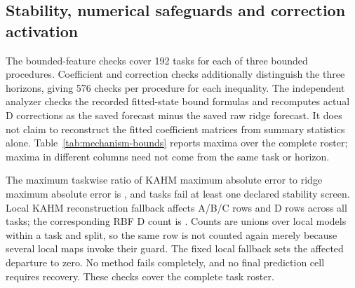 \subsection{Stability, numerical safeguards and correction activation}

The bounded-feature checks cover 192 tasks for each of three bounded
procedures. Coefficient and correction checks additionally distinguish the
three horizons, giving 576 checks per procedure for each inequality. The
independent analyzer checks the recorded fitted-state bound formulas and
recomputes actual D corrections as the saved forecast minus the saved raw
ridge forecast. It does not claim to reconstruct the fitted coefficient
matrices from summary statistics alone. Table~\ref{tab:mechanism-bounds}
reports maxima over the complete roster; maxima in different columns need
not come from the same task or horizon.

\begin{table}[!htbp]
\centering\small
\setlength{\tabcolsep}{5pt}
\caption{Observed ratios to the deterministic bounded-feature and
ridge-readout limits. Feature ratios concern the common block for the
common procedure and the respective departure block for the two appended
procedures; the readout bound uses the complete concatenated feature radius.
A zero correction with a zero bound contributes ratio zero. ``Violations''
sums failed feature, coefficient and correction checks at the fixed numerical
tolerances. These are implementation checks, not confidence intervals for
forecast risk.}
\label{tab:mechanism-bounds}

\end{table}

The maximum taskwise ratio of KAHM maximum absolute error to ridge maximum
absolute error is \RMMaxErrorRatio{}, and \RMStabilityFailures{} tasks fail
at least one declared stability screen. Local KAHM reconstruction fallback
affects \RMKFallbackABC{} A/B/C rows and \RMKFallbackD{} D rows across all
tasks; the corresponding RBF D count is \RMRFallbackD{}. Counts are unions
over local models within a task and split, so the same row is not counted
again merely because several local maps invoke their guard. The fixed local
fallback sets the affected departure to zero. No method fails completely, and no final prediction cell requires
recovery. These checks cover the complete task roster.

\begin{table}[!htbp]
\centering\small
\setlength{\tabcolsep}{4pt}
\caption{C-selected correction activation. Nonlinear and linear counts have
432 and 144 task/horizon cells, respectively. The four mixing-weight columns
combine all 576 cells. A policy choice of raw ridge is counted as zero
correction; raw ridge itself has no mixing selection. Nonzero mixing is not
an empirical guarantee of D improvement, and no minimum activation frequency
was part of the decision.}
\label{tab:mechanism-activation}

\end{table}

